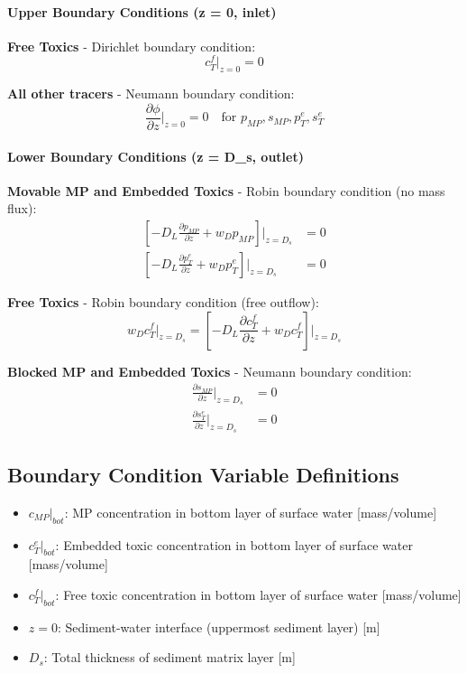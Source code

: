 \documentclass[11pt,a4paper]{article}
\begin{document}
\paragraph{Upper Boundary Conditions (z = 0, inlet)}

\textbf{Free Toxics} - Dirichlet boundary condition:
\begin{equation}
c_T^f\big|_{z=0} = 0
\end{equation}

\textbf{All other tracers} - Neumann boundary condition:
\begin{equation}
\frac{\partial \phi}{\partial z}\bigg|_{z=0} = 0 \quad \text{for } p_{MP}, s_{MP}, p_T^e, s_T^e
\end{equation}

\paragraph{Lower Boundary Conditions (z = D_s, outlet)}

\textbf{Movable MP and Embedded Toxics} - Robin boundary condition (no mass flux):
\begin{align}
\left[-D_L \frac{\partial p_{MP}}{\partial z} + w_D p_{MP}\right]\bigg|_{z=D_s} &= 0 \\[0.5em]
\left[-D_L \frac{\partial p_T^e}{\partial z} + w_D p_T^e\right]\bigg|_{z=D_s} &= 0
\end{align}

\textbf{Free Toxics} - Robin boundary condition (free outflow):
\begin{equation}
w_D c_T^f|_{z=D_s} = \left[-D_L \frac{\partial c_T^f}{\partial z} + w_D c_T^f\right]\bigg|_{z=D_s}
\end{equation}

\textbf{Blocked MP and Embedded Toxics} - Neumann boundary condition:
\begin{align}
\frac{\partial s_{MP}}{\partial z}\bigg|_{z=D_s} &= 0 \\[0.5em]
\frac{\partial s_T^e}{\partial z}\bigg|_{z=D_s} &= 0
\end{align}

\subsection{Boundary Condition Variable Definitions}

\begin{itemize}
    \item $c_{MP}|_{bot}$: MP concentration in bottom layer of surface water [mass/volume]
    \item $c_T^e|_{bot}$: Embedded toxic concentration in bottom layer of surface water [mass/volume]
    \item $c_T^f|_{bot}$: Free toxic concentration in bottom layer of surface water [mass/volume]
    \item $z = 0$: Sediment-water interface (uppermost sediment layer) [m]
    \item $D_s$: Total thickness of sediment matrix layer [m]
\end{itemize}
\end{document}
